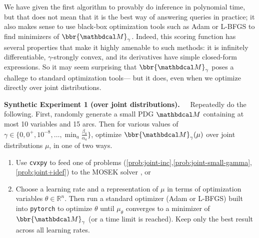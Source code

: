 We have given the first algorithm to provably do inference in polynomial
time, but that does not mean that it is the best way of answering queries in practice;
it also makes sense to use black-box optimization tools such as
    Adam \parencite{kingma2014adam} or L-BFGS \parencite{fletcher2013practical}
    to find minimizers of $\bbr{\dg M}_\gamma$.
Indeed, this scoring function has several properties
    that make it highly amenable to such methods: it is
    infinitely differentiable, $\gamma$-strongly convex, and its
    derivatives have simple closed-form expressions.
So it may seem surprising that $\bbr{\dg M}_\gamma$ poses
a challege to standard optimization tools---%
but it does, 
even when we optimize directly over joint distributions.



\textbf{Synthetic Experiment 1 ({\normalfont over joint distributions}).~~} 
Repeatedly do the following.
First, randomly generate a small PDG $\dg M$ containing 
at most 10 variables and 15 arcs. 
Then for various values of
$\gamma \in \{0, 0^+, 
    10^{-8}, 
     \ldots, \min_a \frac{\beta_a}{\alpha_a} \}$,
optimize $\bbr{\dg M}_\gamma(\mu)$ over joint distributions $\mu$, 
in one of two ways. 
\begin{enumerate}[wide,label=(\alph*),nosep,itemsep=0.2ex]
\item Use \verb|cvxpy| \parencite{diamond2016cvxpy}
to feed  
one of problems (\ref{prob:joint-inc},\ref{prob:joint-small-gamma},\ref{prob:joint+idef})
    to the MOSEK solver \parencite{mosek}, or
\item Choose a learning rate and a representation of $\mu$ in terms of optimization variables $\theta \in \mathbb R^n$.
    Then run a standard optimizer (Adam or L-BFGS) built into \verb|pytorch| \parencite{pytorch}
    to optimize $\theta$
    until $\mu_\theta$ converges to a minimizer of $\bbr{\dg M}_\gamma$ 
        (or a time limit is reached).
    Keep only the best result across all learning rates. 
\end{enumerate}

